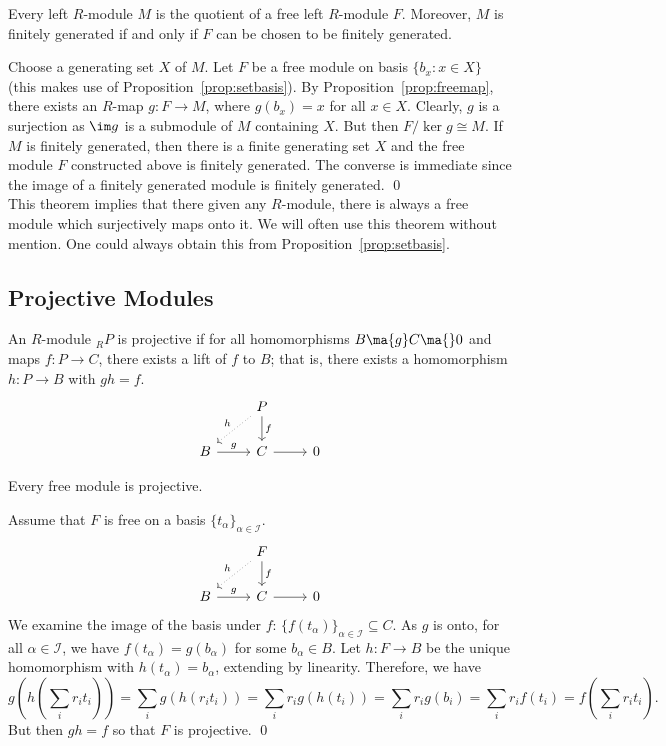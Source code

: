 \begin{thm}
Every left $R$-module $M$ is the quotient of a free left $R$-module $F$. Moreover, $M$ is finitely generated if and only if $F$ can be chosen to be finitely generated. 
\end{thm}

\pf Choose a generating set $X$ of $M$. Let $F$ be a free module on basis $\{b_x \colon x \in X\}$ (this makes use of Proposition~\ref{prop:setbasis}). By Proposition~\ref{prop:freemap}, there exists an $R$-map $g: F \to M$, where $g(b_x)=x$ for all $x \in X$. Clearly, $g$ is a surjection as $\im g$ is a submodule of $M$ containing $X$. But then $F/\ker g \cong M$. If $M$ is finitely generated, then there is a finite generating set $X$ and the free module $F$ constructed above is finitely generated. The converse is immediate since the image of a finitely generated module is finitely generated. \qed \\

This theorem implies that there given any $R$-module, there is always a free module which surjectively maps onto it. We will often use this theorem without mention. One could always obtain this from Proposition~\ref{prop:setbasis}. 



\subsection{Projective Modules}


\begin{dfn}
An $R$-module $_R P$ is projective if for all homomorphisms $B \ma{g} C \ma{} 0$ and maps $f: P \to C$, there exists a lift of $f$ to $B$; that is, there exists a homomorphism $h: P \to B$ with $gh= f$.
	\[
	\begin{tikzcd}
	& P \arrow{d}{f} \arrow[dotted,swap]{dl}{h} & \\
	B \arrow{r}{g} & C \arrow{r} & 0
	\end{tikzcd}
	\]
\end{dfn}


\begin{lem}
Every free module is projective.
\end{lem}

\pf Assume that $F$ is free on a basis $\{t_\alpha\}_{\alpha \in \mathcal{I}}$. 
	\[
	\begin{tikzcd}
	& F \arrow{d}{f} \arrow[dotted,swap]{dl}{h} & \\
	B \arrow{r}{g} & C \arrow{r} & 0
	\end{tikzcd}
	\]
We examine the image of the basis under $f$: $\{f(t_\alpha)\}_{\alpha \in \mathcal{I}} \subseteq C$. As $g$ is onto, for all $\alpha \in \mathcal{I}$, we have $f(t_\alpha)= g(b_\alpha)$ for some $b_\alpha \in B$. Let $h: F \to B$ be the unique homomorphism with $h(t_\alpha)= b_\alpha$, extending by linearity. Therefore, we have
	\[
	g\left( h\left( \sum_i r_i t_i \right)\right) =  \sum_i g(h(r_it_i))= \sum_i r_i g(h(t_i))= \sum_i r_i g(b_i)= \sum_i r_i f(t_i)=  f\left(\sum_i r_it_i\right).
	\]
But then $gh=f$ so that $F$ is projective. \qed \\


